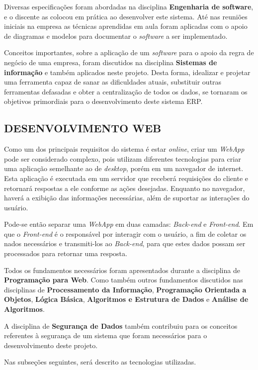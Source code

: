 \documentclass[
  12pt,				%
  openany,
  oneside,
  a4paper,			%
  english,			%
  brazil
]{article}
\numberwithin{figure}{section}
\numberwithin{table}{section}
\begin{document}
Diversas especificações foram abordadas na disciplina \textbf{Engenharia de software}, e o discente as colocou em prática ao desenvolver este sistema. Até nas reuniões iniciais na empresa as técnicas aprendidas em aula foram aplicadas com o apoio de diagramas e modelos para documentar o \textit{software} a ser implementado.

Conceitos importantes, sobre a aplicação de um \textit{software} para o apoio da regra de negócio de uma empresa, foram discutidos na disciplina \textbf{Sistemas de informação} e também aplicados neste projeto. Desta forma, idealizar e projetar uma ferramenta capaz de sanar as dificuldades atuais, substituir outras ferramentas defasadas e obter a centralização de todos os dados, se tornaram os objetivos primordiais para o desenvolvimento deste sistema ERP.

\subsection{DESENVOLVIMENTO WEB}
Como um dos principais requisitos do sistema é estar \textit{online}, criar um \textit{WebApp} pode ser considerado complexo, pois utilizam diferentes tecnologias para criar uma aplicação semelhante ao de \textit{desktop}, porém em um navegador de internet. Esta aplicação é executada em um servidor que receberá requisições do cliente e retornará respostas a ele conforme as ações desejadas. Enquanto no navegador, haverá a exibição das informações necessárias, além de suportar as interações do usuário. 

Pode-se então separar uma \textit{WebApp} em duas camadas: \textit{Back-end} e \textit{Front-end}. Em que o \textit{Front-end} é o responsável por interagir com o usuário, a fim de coletar os nados necessários e transmiti-los ao \textit{Back-end}, para que estes dados possam ser processados para retornar uma resposta.

Todos os fundamentos necessários foram apresentados durante a disciplina de \textbf{Programação para Web}. Como também outros fundamentos discutidos nas disciplinas de \textbf{Processamento da Informação}, \textbf{Programação Orientada a Objetos}, \textbf{Lógica Básica}, \textbf{Algoritmos e Estrutura de Dados} e \textbf{Análise de Algoritmos}. 

A disciplina de \textbf{Segurança de Dados} também contribuiu para os conceitos referentes à segurança de um sistema que foram necessários para o desenvolvimento deste projeto.

Nas subseções seguintes, será descrito as tecnologias utilizadas.
\end{document}
